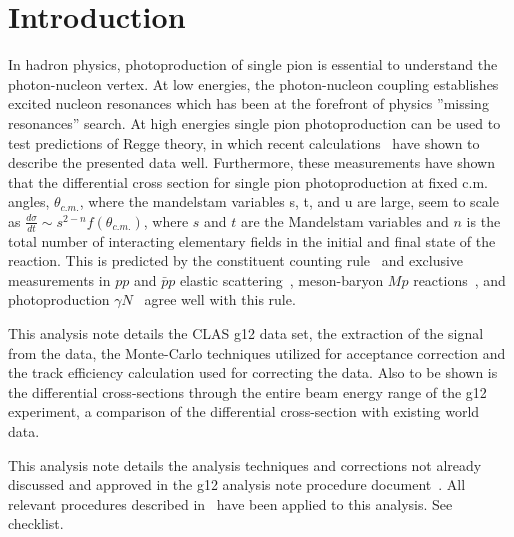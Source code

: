 \section{Introduction}\label{sec:intro}
	In hadron physics, photoproduction of single pion is essential to understand the photon-nucleon vertex. At low energies, the photon-nucleon coupling establishes excited nucleon resonances which has been at the forefront of physics ''missing resonances'' search. At high energies single pion photoproduction can be used to test predictions of Regge theory, in which recent calculations~\cite{JPAC} have shown to describe the presented data well. Furthermore, these measurements have shown that the differential cross section for single pion photoproduction at fixed c.m. angles, $\theta_{c.m.}$, where the mandelstam variables s, t, and u are large, seem to scale as $\frac{d\sigma}{dt} \sim s^{2-n}f(\theta_{c.m.})$, where $s$ and $t$ are the Mandelstam variables and $n$ is the total number of interacting elementary fields in the initial and final state of the reaction. This is predicted by the constituent counting rule~\cite{scaling1,scaling2} and exclusive measurements in $pp$ and  $\bar{p}p$ elastic scattering~\cite{scalingexp5, scalingexp7}, meson-baryon $M p$ reactions~\cite{scalingexp7}, and photoproduction $\gamma N$~\cite{scalingexp2, scalingexp3, scalingexp4, scalingexp6, scalingexp8, scalingexp9, scalingexp10, scalingexp11} agree well with this rule.
	
	This analysis note details the CLAS g12 data set, the extraction of the \pizT signal from the data, the Monte-Carlo techniques utilized for acceptance correction and the track efficiency calculation used for correcting the data. Also to be shown is the differential cross-sections through the entire beam energy range of the g12 experiment, a comparison of the differential cross-section with existing world data. 
	
	This analysis note details the analysis techniques and corrections not already discussed and approved in the g12 analysis note procedure document~\cite{g12note}. All relevant procedures described in~\cite{g12note} have been applied to this analysis. See checklist.
	

